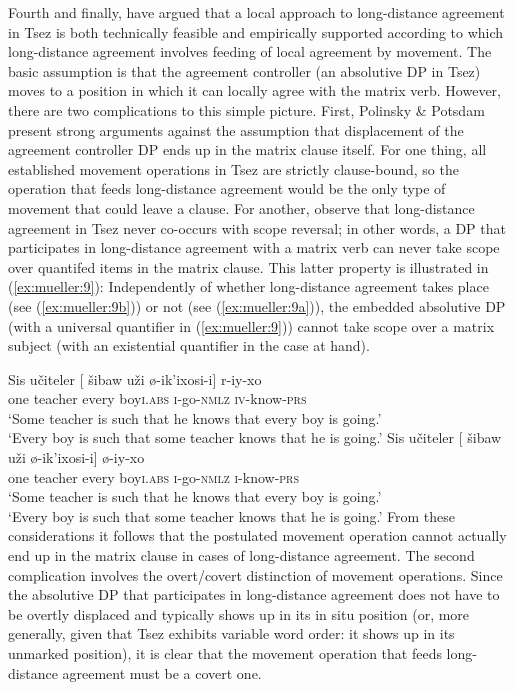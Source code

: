 \documentclass[output=paper
,modfonts
,nonflat]{langsci/langscibook}
\begin{document}
	Fourth and finally, \cite{PolinskyPotsdam:01} have argued that a
	local approach to long-distance agreement in Tsez is both technically
	feasible and empirically supported according to which long-distance
	agreement involves feeding of local agreement by movement. The basic
	assumption is that the agreement controller (an absolutive DP in Tsez)
	moves to a position in which it can locally agree with the matrix
	verb. However, there are two complications to this simple
	picture. First, Polinsky \& Potsdam present strong arguments against
	the assumption that displacement of the agreement controller DP ends
	up in the matrix clause itself. For one thing, all established
	movement operations in Tsez are strictly clause-bound, so the 
	operation that feeds long-distance agreement would be the only type of
	movement that could leave a clause. For another,
	\cite{PolinskyPotsdam:01} observe that long-distance
	agreement in Tsez never co-occurs with scope reversal; in other words,
	a DP that participates in long-distance agreement with a matrix verb
	can never take scope over quantifed items in the matrix clause.
	This latter property is illustrated in (\ref{ex:mueller:9}): Independently of whether
	long-distance agreement takes place (see (\ref{ex:mueller:9b})) or not (see
	(\ref{ex:mueller:9a})), the embedded absolutive DP (with a universal quantifier in
	(\ref{ex:mueller:9})) cannot take scope over a  matrix subject (with an existential
	quantifier in the case at hand). 
	
	\ea \label{ex:mueller:9}  \label{scope32}
	\ea \label{ex:mueller:9a}
	\gll Sis u\v{c}iteler [\sub{$\alpha$} \v{s}ibaw u\v{z}i \o -ik'ixosi-\textbeltl i] r-iy-xo \\
	one teacher {} every boy{\scshape i}.{\scshape abs} {\scshape i}-go-{\scshape nmlz} {\scshape iv}-know-{\scshape prs}  \\
	\glt `Some teacher is such that he knows that every boy is going.'\\
	`Every boy is such that some teacher knows that he is going.'
	\ex \label{ex:mueller:9b}
	\gll Sis u\v{c}iteler [\sub{$\alpha$} \v{s}ibaw u\v{z}i \o -ik'ixosi-\textbeltl i] \o -iy-xo \\
	one teacher {} every boy{\scshape i}.{\scshape abs} {\scshape i}-go-{\scshape nmlz} {\scshape i}-know-{\scshape prs}  \\
	\glt      `Some teacher is such that he knows that every boy is going.'\\
	`Every boy is such that some teacher knows that he is going.'
	\z
	\z
	From these considerations it follows that the postulated movement operation
	cannot actually end up in the matrix clause in cases of long-distance
	agreement. The second complication involves the overt/covert
	distinction of movement operations. Since the absolutive DP that participates in
	long-distance agreement does not have to be overtly
	displaced and typically shows up in its in situ position (or, more generally, given
	that Tsez exhibits variable word order: it shows up in its unmarked position),
	it is clear that the movement operation that feeds long-distance
	agreement must be a covert one. 
	
\end{document}
